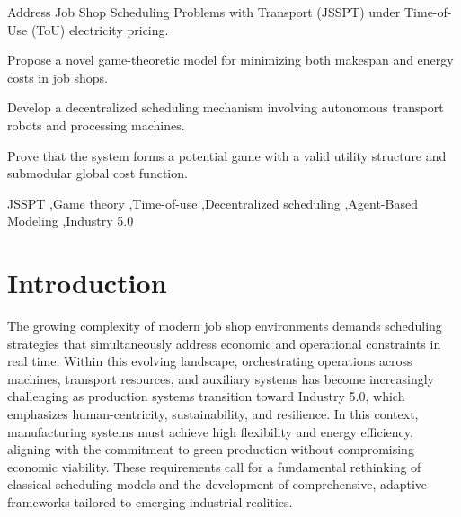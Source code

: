 \documentclass[preprint, 3p, review, 12pt]{elsarticle}
\begin{document}
\begin{frontmatter}
\author[3]{M'hammed SAHNOUN} %


\begin{abstract}
Abstract text.
\end{abstract}

\begin{graphicalabstract}
\end{graphicalabstract}

\begin{highlights}
\item Address Job Shop Scheduling Problems with Transport (JSSPT) under Time-of-Use (ToU) electricity pricing.
\item Propose a novel game-theoretic model for minimizing both makespan and energy costs in job shops.
\item Develop a decentralized scheduling mechanism involving autonomous transport robots and processing machines.
\item Prove that the system forms a potential game with a valid utility structure and submodular global cost function.
\end{highlights}

\begin{keyword}
JSSPT \sep Game theory \sep Time-of-use \sep Decentralized scheduling \sep Agent-Based Modeling \sep Industry 5.0



\end{keyword}

\end{frontmatter}

\section{Introduction}
\label{sec:intro}
The growing complexity of modern job shop environments demands scheduling strategies that simultaneously address economic and operational constraints in real time. Within this evolving landscape, orchestrating operations across machines, transport resources, and auxiliary systems has become increasingly challenging as production systems transition toward Industry 5.0, which emphasizes human-centricity, sustainability, and resilience. In this context, manufacturing systems must achieve high flexibility and energy efficiency, aligning with the commitment to green production without compromising economic viability. These requirements call for a fundamental rethinking of classical scheduling models and the development of comprehensive, adaptive frameworks tailored to emerging industrial realities.
\end{document}
